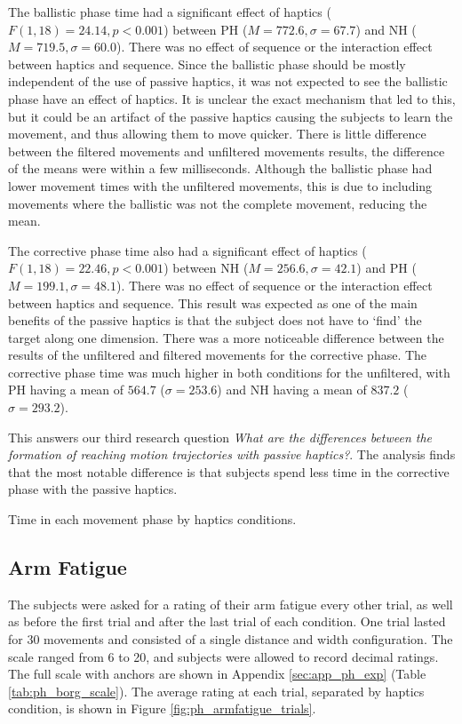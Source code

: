 The ballistic phase time had a significant effect of haptics ($F(1, 18)=24.14, p<0.001$) between PH ($M=772.6, \sigma=67.7$) and NH ($M=719.5, \sigma=60.0$).
There was no effect of sequence or the interaction effect between haptics and sequence.
Since the ballistic phase should be mostly independent of the use of passive haptics, it was not expected to see the ballistic phase have an effect of haptics.
It is unclear the exact mechanism that led to this, but it could be an artifact of the passive haptics causing the subjects to learn the movement, and thus allowing them to move quicker.
There is little difference between the filtered movements and unfiltered movements results, the difference of the means were within a few milliseconds.
Although the ballistic phase had lower movement times with the unfiltered movements, this is due to including movements where the ballistic was not the complete movement, reducing the mean.

The corrective phase time also had a significant effect of haptics ($F(1, 18)=22.46, p<0.001$) between NH ($M=256.6, \sigma=42.1$) and PH ($M=199.1, \sigma=48.1$).
There was no effect of sequence or the interaction effect between haptics and sequence.
This result was expected as one of the main benefits of the passive haptics is that the subject does not have to `find' the target along one dimension.
There was a more noticeable difference between the results of the unfiltered and filtered movements for the corrective phase.
The corrective phase time was much higher in both conditions for the unfiltered, with PH having a mean of $564.7$ ($\sigma=253.6$) and NH having a mean of $837.2$ ($\sigma=293.2$).

This answers our third research question \emph{What are the differences between the formation of reaching motion trajectories with passive haptics?}.
The analysis finds that the most notable difference is that subjects spend less time in the corrective phase with the passive haptics.

\begin{table}
    \centering
    \caption{Time in each movement phase by haptics conditions.}
    \label{tab:ph_phases}
\end{table}

\subsection{Arm Fatigue}

The subjects were asked for a rating of their arm fatigue every other trial, as well as before the first trial and after the last trial of each condition.
One trial lasted for 30 movements and consisted of a single distance and width configuration.
The scale ranged from 6 to 20, and subjects were allowed to record decimal ratings.
The full scale with anchors are shown in Appendix \ref{sec:app_ph_exp} (Table \ref{tab:ph_borg_scale}).
The average rating at each trial, separated by haptics condition, is shown in Figure \ref{fig:ph_armfatigue_trials}.

